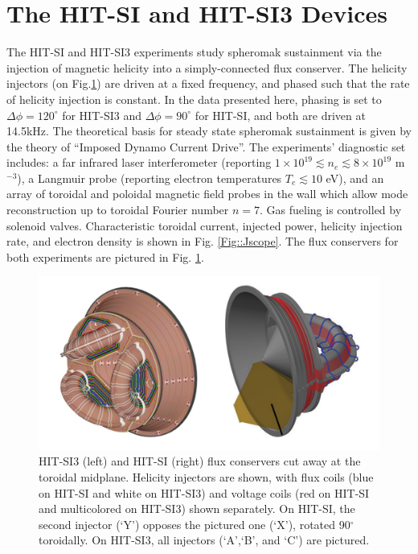 \section{The HIT-SI and HIT-SI3 Devices}
\hspace{4ex}The HIT-SI\cite{sieck2005initial} and HIT-SI3\cite{Hossack_HitSi3} experiments study spheromak sustainment via the injection of magnetic helicity into a simply-connected flux conserver. The helicity injectors (on Fig.\ref{Fig::V-Tank}) are driven at a fixed frequency, and phased such that the rate of helicity injection is constant. In the data presented here, phasing is set to  $\Delta\phi=120^\circ$ for HIT-SI3 and $\Delta\phi=90^\circ$ for HIT-SI, and both are driven at 14.5kHz. The theoretical basis for steady state spheromak sustainment is given by the theory of ``Imposed Dynamo Current Drive''\cite{jarboe2012imposed}. The experiments' diagnostic set includes: a far infrared laser interferometer (reporting $1\times10^{19}\lesssim{n_e}\lesssim8\times10^{19}$  m$^{-3}$)\cite{hossack2013reduction}, a Langmuir probe (reporting electron temperatures $T_e\lesssim10$ eV)\cite{ONeil2007experimental}, and an array of toroidal and poloidal magnetic field probes in the wall\cite{Oneil2007overview} which allow mode reconstruction up to toroidal Fourier number $n=7$. Gas fueling is controlled by solenoid valves. Characteristic toroidal current, injected power, helicity injection rate, and electron density is shown in Fig. \ref{Fig::Jscope}. The flux conservers for both experiments are pictured in Fig. \ref{Fig::V-Tank}.
\begin{figure}
\includegraphics[width=6in]{V_Tank}\caption{HIT-SI3 (left) and HIT-SI (right) flux conservers cut away at the toroidal midplane. Helicity injectors are shown, with flux coils (blue on HIT-SI and white on HIT-SI3) and voltage coils (red on HIT-SI and multicolored on HIT-SI3) shown separately. On HIT-SI, the second injector (`Y') opposes the pictured one (`X'), rotated 90$^\circ$ toroidally. On HIT-SI3, all injectors (`A',`B', and `C') are pictured. }\label{Fig::V-Tank}
\end{figure}

